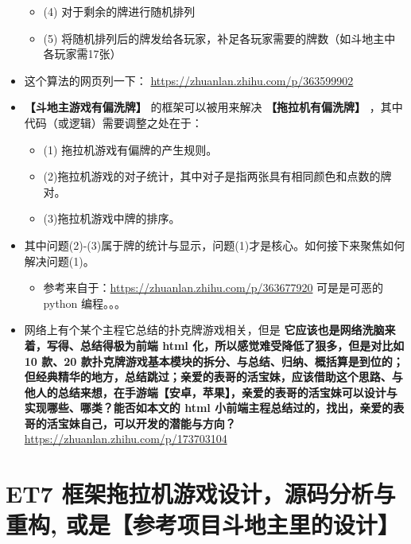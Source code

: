 \documentclass[9pt, b5paper]{article}
\begin{document}
\begin{itemize}
\begin{itemize}
\item (4) 对于剩余的牌进行随机排列
\item (5) 将随机排列后的牌发给各玩家，补足各玩家需要的牌数（如斗地主中各玩家需17张）
\end{itemize}
\item 这个算法的网页列一下： \url{https://zhuanlan.zhihu.com/p/363599902}
\item \textbf{【斗地主游戏有偏洗牌】} 的框架可以被用来解决 \textbf{【拖拉机有偏洗牌】} ，其中代码（或逻辑）需要调整之处在于：
\begin{itemize}
\item (1) 拖拉机游戏有偏牌的产生规则。
\item (2)拖拉机游戏的对子统计，其中对子是指两张具有相同颜色和点数的牌对。
\item (3)拖拉机游戏中牌的排序。
\end{itemize}
\item 其中问题(2)-(3)属于牌的统计与显示，问题(1)才是核心。如何接下来聚焦如何解决问题(1)。
\begin{itemize}
\item 参考来自于：\url{https://zhuanlan.zhihu.com/p/363677920} 可是是可恶的 python 编程。。。
\end{itemize}
\item 网络上有个某个主程它总结的扑克牌游戏相关，但是 \textbf{它应该也是网络洗脑来着，写得、总结得极为前端 html 化，所以感觉难受降低了狠多，但是对比如 10 款、20 款扑克牌游戏基本模块的拆分、与总结、归纳、概括算是到位的；但经典精华的地方，总结跳过；亲爱的表哥的活宝妹，应该借助这个思路、与他人的总结来想，在手游端【安卓，苹果】，亲爱的表哥的活宝妹可以设计与实现哪些、哪类？能否如本文的 html 小前端主程总结过的，找出，亲爱的表哥的活宝妹自己，可以开发的潜能与方向？} \url{https://zhuanlan.zhihu.com/p/173703104}
\end{itemize}
\section{ET7 框架拖拉机游戏设计，源码分析与重构, 或是【参考项目斗地主里的设计】}
\label{sec-3}
\end{document}
